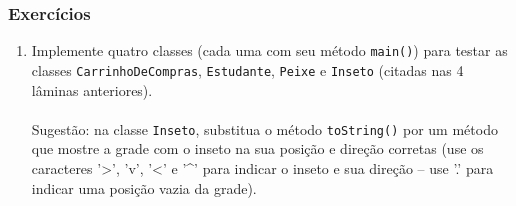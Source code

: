 \documentclass[xcolor={dvipsnames,table},aspectratio=169]{beamer}
\begin{document}
\begin{frame}[fragile]\frametitle{Exercícios}
\begin{enumerate}
	\item Implemente quatro classes (cada uma com seu método \texttt{main()}) para testar as classes \texttt{CarrinhoDeCompras}, \texttt{Estudante}, \texttt{Peixe} e \texttt{Inseto} (citadas nas 4 lâminas anteriores).\\\scriptsize{~\\Sugestão: na classe \texttt{Inseto}, substitua o método \texttt{toString()} por um método que mostre a grade com o inseto na sua posição e direção corretas (use os caracteres '>', 'v', '<' e '\textasciicircum' para indicar o inseto e sua direção -- use '.' para indicar uma posição vazia da grade).}
\end{enumerate}
\end{frame}

\end{document}
